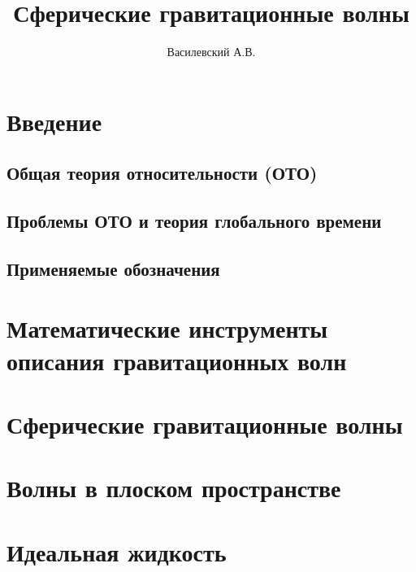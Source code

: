 \documentclass[12pt,a4paper]{article}
\title{Сферические гравитационные волны}
\author{Василевский А.В.}
\providecommand{\docroot}{../..}
\begin{document}
    \makedocroot

    \maketitle
    \tableofcontents

    \section{Введение}

        \subsection{Общая теория относительности (ОТО)}
        

        \subsection{Проблемы ОТО и теория глобального времени}
        

        \subsection{Применяемые обозначения}
        

    \section{Математические инструменты описания гравитационных волн}
    

    \section{Сферические гравитационные волны}
    

    \section{Волны в плоском пространстве}
    

    \section{Идеальная жидкость}
    
\end{document}
